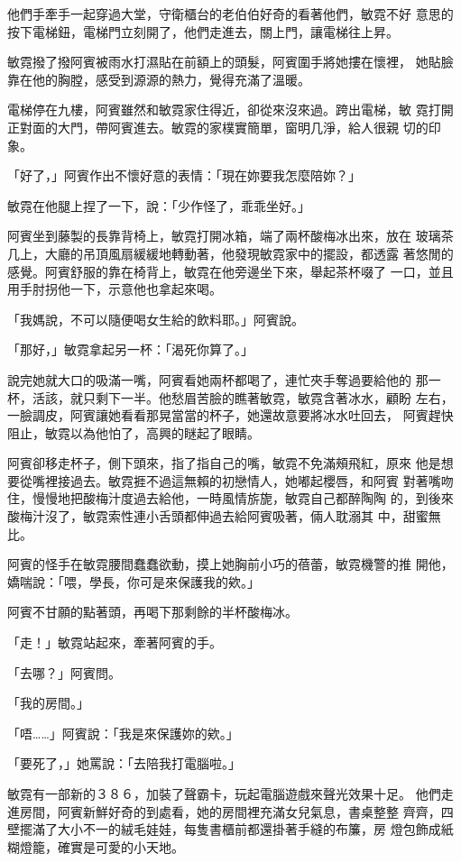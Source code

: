 他們手牽手一起穿過大堂，守衛櫃台的老伯伯好奇的看著他們，敏霓不好
意思的按下電梯鈕，電梯門立刻開了，他們走進去，關上門，讓電梯往上昇。

敏霓撥了撥阿賓被雨水打濕貼在前額上的頭髮，阿賓圍手將她摟在懷裡，
她貼臉靠在他的胸膛，感受到源源的熱力，覺得充滿了溫暖。

電梯停在九樓，阿賓雖然和敏霓家住得近，卻從來沒來過。跨出電梯，敏
霓打開正對面的大門，帶阿賓進去。敏霓的家樸實簡單，窗明几淨，給人很親
切的印象。

「好了，」阿賓作出不懷好意的表情：「現在妳要我怎麼陪妳？」

敏霓在他腿上捏了一下，說：「少作怪了，乖乖坐好。」

阿賓坐到藤製的長靠背椅上，敏霓打開冰箱，端了兩杯酸梅冰出來，放在
玻璃茶几上，大廳的吊頂風扇緩緩地轉動著，他發現敏霓家中的擺設，都透露
著悠閒的感覺。阿賓舒服的靠在椅背上，敏霓在他旁邊坐下來，舉起茶杯啜了
一口，並且用手肘拐他一下，示意他也拿起來喝。

「我媽說，不可以隨便喝女生給的飲料耶。」阿賓說。

「那好，」敏霓拿起另一杯：「渴死你算了。」

說完她就大口的吸滿一嘴，阿賓看她兩杯都喝了，連忙夾手奪過要給他的
那一杯，活該，就只剩下一半。他愁眉苦臉的瞧著敏霓，敏霓含著冰水，顧盼
左右，一臉調皮，阿賓讓她看看那晃當當的杯子，她還故意要將冰水吐回去，
阿賓趕快阻止，敏霓以為他怕了，高興的瞇起了眼睛。

阿賓卻移走杯子，側下頭來，指了指自己的嘴，敏霓不免滿頰飛紅，原來
他是想要從嘴裡接過去。敏霓捱不過這無賴的初戀情人，她嘟起櫻唇，和阿賓
對著嘴吻住，慢慢地把酸梅汁度過去給他，一時風情旂旎，敏霓自己都醉陶陶
的，到後來酸梅汁沒了，敏霓索性連小舌頭都伸過去給阿賓吸著，倆人耽溺其
中，甜蜜無比。

阿賓的怪手在敏霓腰間蠢蠢欲動，摸上她胸前小巧的蓓蕾，敏霓機警的推
開他，嬌喘說：「喂，學長，你可是來保護我的欸。」

阿賓不甘願的點著頭，再喝下那剩餘的半杯酸梅冰。

「走！」敏霓站起來，牽著阿賓的手。

「去哪？」阿賓問。

「我的房間。」

「唔……」阿賓說：「我是來保護妳的欸。」

「要死了，」她罵說：「去陪我打電腦啦。」

敏霓有一部新的３８６，加裝了聲霸卡，玩起電腦遊戲來聲光效果十足。
他們走進房間，阿賓新鮮好奇的到處看，她的房間裡充滿女兒氣息，書桌整整
齊齊，四壁擺滿了大小不一的絨毛娃娃，每隻書櫃前都還掛著手縫的布簾，房
燈包飾成紙糊燈籠，確實是可愛的小天地。

